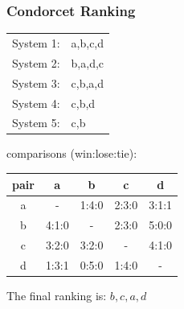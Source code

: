 \documentclass{beamer}
\begin{document}
\begin{frame}
    \frametitle{Condorcet Ranking}

    \begin{tabular}{|ll|}
      \hline
      System 1: & a,b,c,d \\
      System 2: & b,a,d,c \\
      System 3: & c,b,a,d \\
      System 4: & c,b,d \\
      System 5: & c,b \\
      \hline
    \end{tabular}

    \begin{block} {comparisons (win:lose:tie):} 

        \centering
        \begin{tabular}{c|c|c|c|c|}
          pair & a & b & c & d \\
          \hline
          a & - & 1:4:0 & 2:3:0 & 3:1:1 \\
          b & 4:1:0 & - & 2:3:0 & 5:0:0 \\
          c & 3:2:0 & 3:2:0 & - & 4:1:0 \\
          d & 1:3:1 & 0:5:0 & 1:4:0 & - \\
          \hline
        \end{tabular}





    \end{block}

    The final ranking is: $b,c,a,d$


\end{frame}
\end{document}
